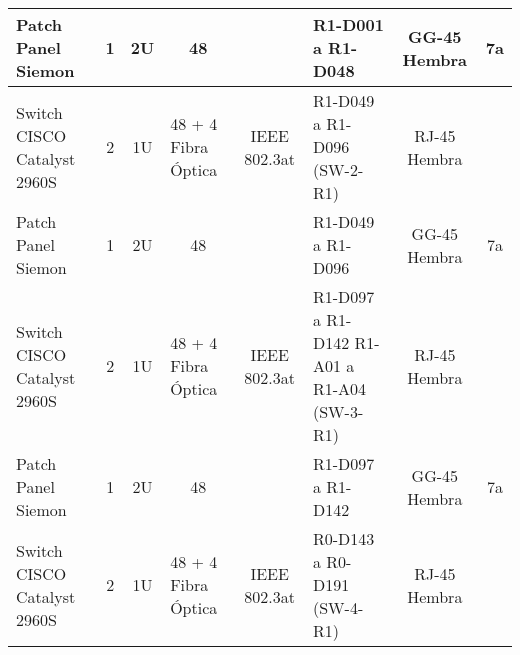 \begin{table}[htbp]
\begin{tabular}{|p{2.5cm}|p{1.6cm}|llllll}
		Patch Panel Siemon                                                 & \multicolumn{1}{c|}{1}                      & \multicolumn{1}{c|}{2U}              & \multicolumn{1}{c|}{48}                  & \multicolumn{1}{c|}{}                  & \multicolumn{1}{p{1.6cm}|}{R1-D001 a R1-D048}           & \multicolumn{1}{c|}{GG-45 Hembra}              & \multicolumn{1}{c|}{7a}                  \\ \hline
		Switch CISCO Catalyst 2960S                                        & \multicolumn{1}{c|}{2}                      & \multicolumn{1}{c|}{1U}              & \multicolumn{1}{p{1.2cm}|}{48 + 4 Fibra Óptica} & \multicolumn{1}{c|}{IEEE 802.3at}      & \multicolumn{1}{p{1.6cm}|}{R1-D049 a R1-D096 (SW-2-R1)} & \multicolumn{1}{c|}{RJ-45 Hembra}              & \multicolumn{1}{c|}{}                   \\ \hline
		Patch Panel Siemon                                                 & \multicolumn{1}{c|}{1}                      & \multicolumn{1}{c|}{2U}              & \multicolumn{1}{c|}{48}                  & \multicolumn{1}{c|}{}                  & \multicolumn{1}{p{1.6cm}|}{R1-D049 a R1-D096}           & \multicolumn{1}{c|}{GG-45 Hembra}              & \multicolumn{1}{c|}{7a}                  \\ \hline
		Switch CISCO Catalyst 2960S                                        & \multicolumn{1}{c|}{2}                      & \multicolumn{1}{c|}{1U}              & \multicolumn{1}{p{1.2cm}|}{48 + 4 Fibra Óptica} & \multicolumn{1}{c|}{IEEE 802.3at}      & \multicolumn{1}{p{1.6cm}|}{R1-D097 a R1-D142 R1-A01 a R1-A04 (SW-3-R1)} & \multicolumn{1}{c|}{RJ-45 Hembra}              & \multicolumn{1}{c|}{}                   \\ \hline
		Patch Panel Siemon                                                 & \multicolumn{1}{c|}{1}                      & \multicolumn{1}{c|}{2U}              & \multicolumn{1}{c|}{48}                  & \multicolumn{1}{c|}{}                  & \multicolumn{1}{p{1.6cm}|}{R1-D097 a R1-D142}           & \multicolumn{1}{c|}{GG-45 Hembra}              & \multicolumn{1}{c|}{7a}                  \\ \hline
		Switch CISCO Catalyst 2960S                                        & \multicolumn{1}{c|}{2}                      & \multicolumn{1}{c|}{1U}              & \multicolumn{1}{p{1.2cm}|}{48 + 4 Fibra Óptica} & \multicolumn{1}{c|}{IEEE 802.3at}      & \multicolumn{1}{p{1.6cm}|}{R0-D143 a R0-D191 (SW-4-R1)} & \multicolumn{1}{c|}{RJ-45 Hembra}              & \multicolumn{1}{c|}{}                   \\ \hline

\end{tabular}
\end{table}
